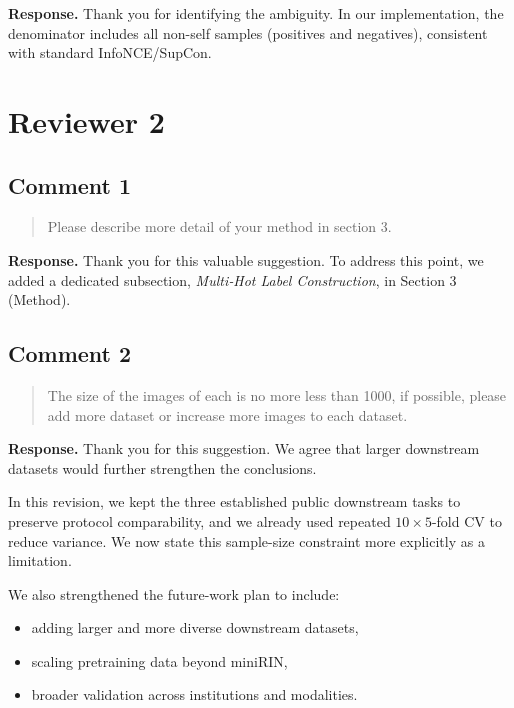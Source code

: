 \documentclass[11pt]{article}
\begin{document}
\textbf{Response.}
Thank you for identifying the ambiguity.
In our implementation, the denominator includes all non-self samples (positives and negatives), consistent with standard InfoNCE/SupCon.

\section*{Reviewer 2}

\subsection*{Comment 1}
\begin{quote}
Please describe more detail of your method in section 3.
\end{quote}

\textbf{Response.}
Thank you for this valuable suggestion.
To address this point, we added a dedicated subsection, \emph{Multi‑Hot Label Construction}, in Section 3 (Method).

\subsection*{Comment 2}
\begin{quote}
The size of the images of each is no more less than 1000, if possible, please add more dataset or increase more images to each dataset.
\end{quote}

\textbf{Response.}
Thank you for this suggestion.
We agree that larger downstream datasets would further strengthen the conclusions.

In this revision, we kept the three established public downstream tasks to preserve protocol comparability, and we already used repeated \(10\times5\)-fold CV to reduce variance.
We now state this sample-size constraint more explicitly as a limitation.

We also strengthened the future-work plan to include:
\begin{itemize}[leftmargin=1.5em,noitemsep,topsep=0.3em]
\item adding larger and more diverse downstream datasets,
\item scaling pretraining data beyond miniRIN,
\item broader validation across institutions and modalities.
\end{itemize}
\end{document}
